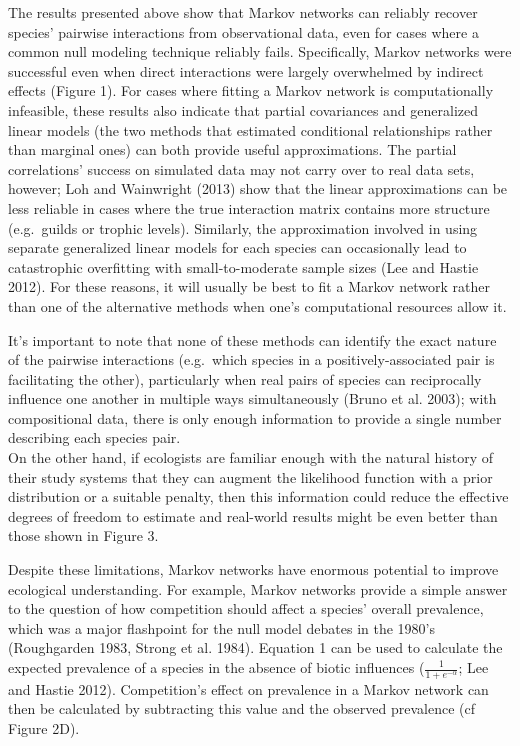 \documentclass[12pt,]{article}
\begin{document}
\begin{spacing}{1.9}
\begin{flushleft}
The results presented above show that Markov networks can reliably
recover species' pairwise interactions from observational data, even for
cases where a common null modeling technique reliably fails.
Specifically, Markov networks were successful even when direct
interactions were largely overwhelmed by indirect effects (Figure 1).
For cases where fitting a Markov network is computationally infeasible,
these results also indicate that partial covariances and generalized
linear models (the two methods that estimated conditional relationships
rather than marginal ones) can both provide useful approximations. The
partial correlations' success on simulated data may not carry over to
real data sets, however; Loh and Wainwright (2013) show that the linear
approximations can be less reliable in cases where the true interaction
matrix contains more structure (e.g.~guilds or trophic levels).
Similarly, the approximation involved in using separate generalized
linear models for each species can occasionally lead to catastrophic
overfitting with small-to-moderate sample sizes (Lee and Hastie 2012).
For these reasons, it will usually be best to fit a Markov network
rather than one of the alternative methods when one's computational
resources allow it.

It's important to note that none of these methods can identify the exact
nature of the pairwise interactions (e.g.~which species in a
positively-associated pair is facilitating the other), particularly when
real pairs of species can reciprocally influence one another in multiple
ways simultaneously (Bruno et al. 2003); with compositional data, there
is only enough information to provide a single number describing each
species pair.\\On the other hand, if ecologists are familiar enough with
the natural history of their study systems that they can augment the
likelihood function with a prior distribution or a suitable penalty,
then this information could reduce the effective degrees of freedom to
estimate and real-world results might be even better than those shown in
Figure 3.

Despite these limitations, Markov networks have enormous potential to
improve ecological understanding. For example, Markov networks provide a
simple answer to the question of how competition should affect a
species' overall prevalence, which was a major flashpoint for the null
model debates in the 1980's (Roughgarden 1983, Strong et al. 1984).
Equation 1 can be used to calculate the expected prevalence of a species
in the absence of biotic influences (\(\frac{1}{1 + e^{-\alpha}}\); Lee
and Hastie 2012). Competition's effect on prevalence in a Markov network
can then be calculated by subtracting this value and the observed
prevalence (cf Figure 2D).


\end{flushleft}
\end{spacing}
\end{document}
